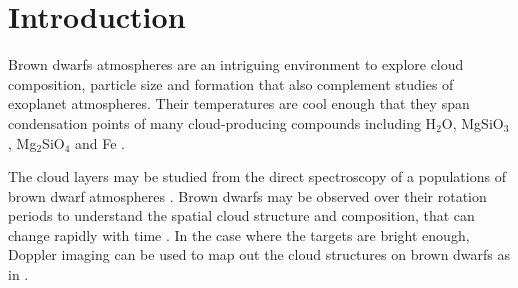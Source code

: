 \documentclass[twocolumn]{aastex6}
\begin{document}





\section{Introduction}

Brown dwarfs atmospheres are an intriguing environment to explore cloud composition, particle size and formation that also complement studies of exoplanet atmospheres.
Their temperatures are cool enough that they span condensation points of many cloud-producing  compounds including H$_2$O, MgSiO$_3$, Mg$_2$SiO$_4$ and Fe \citep{marley2015rev}.

The cloud layers may be studied from the direct spectroscopy of a populations of brown dwarf atmospheres \citep[e.g.][]{burgasser2006ltTrans,liu2006}.
Brown dwarfs may be observed over their rotation periods to understand the spatial cloud structure and composition, that can change rapidly with time \citep[e.g.][]{yang2016exStormsBD}.
In the case where the targets are bright enough, Doppler imaging can be used to map out the cloud structures on brown dwarfs as in \citet{crossfield2014dopplerimg}.
\end{document}
